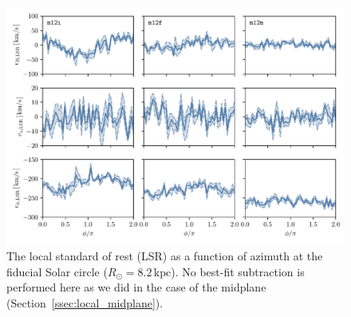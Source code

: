\documentclass[twocolumn]{aastex62}
\newcommand{\kpc}{\text{kpc}}
\begin{document}
\begin{figure}
\begin{center}
\includegraphics[width=\textwidth]{fig/lsr.pdf}
\end{center}
\caption{The local standard of rest (LSR) as a function of azimuth at the
fiducial Solar circle ($R_{\odot} = 8.2\,\kpc$). No best-fit subtraction is
performed here as we did in the case of the midplane
(Section~\ref{ssec:local_midplane}).}
\end{figure}


\end{document}
